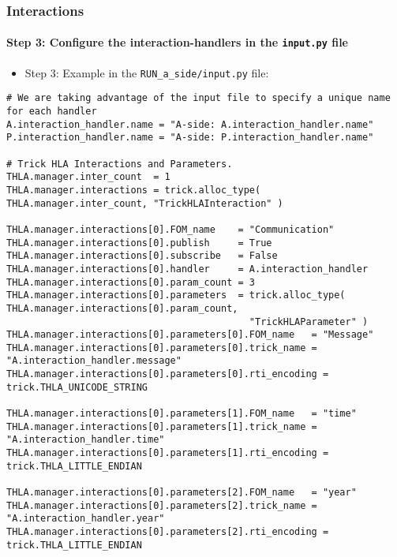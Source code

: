    \begin{frame}[fragile]
      \frametitle{Interactions}
      \framesubtitle{Step 3: Configure the interaction-handlers in the \texttt{input.py} file}
      \begin{itemize}
         \item Step 3: Example in the \texttt{RUN\_a\_side/input.py} file:
      \end{itemize}
\begin{Verbatim}[frame=single, fontsize=\tiny]
# We are taking advantage of the input file to specify a unique name for each handler
A.interaction_handler.name = "A-side: A.interaction_handler.name"
P.interaction_handler.name = "A-side: P.interaction_handler.name"

# Trick HLA Interactions and Parameters.
THLA.manager.inter_count  = 1
THLA.manager.interactions = trick.alloc_type( THLA.manager.inter_count, "TrickHLAInteraction" )

THLA.manager.interactions[0].FOM_name    = "Communication"
THLA.manager.interactions[0].publish     = True
THLA.manager.interactions[0].subscribe   = False
THLA.manager.interactions[0].handler     = A.interaction_handler
THLA.manager.interactions[0].param_count = 3
THLA.manager.interactions[0].parameters  = trick.alloc_type( THLA.manager.interactions[0].param_count,
                                           "TrickHLAParameter" )
THLA.manager.interactions[0].parameters[0].FOM_name   = "Message"
THLA.manager.interactions[0].parameters[0].trick_name = "A.interaction_handler.message"
THLA.manager.interactions[0].parameters[0].rti_encoding = trick.THLA_UNICODE_STRING

THLA.manager.interactions[0].parameters[1].FOM_name   = "time"
THLA.manager.interactions[0].parameters[1].trick_name = "A.interaction_handler.time"
THLA.manager.interactions[0].parameters[1].rti_encoding = trick.THLA_LITTLE_ENDIAN

THLA.manager.interactions[0].parameters[2].FOM_name   = "year"
THLA.manager.interactions[0].parameters[2].trick_name = "A.interaction_handler.year"
THLA.manager.interactions[0].parameters[2].rti_encoding = trick.THLA_LITTLE_ENDIAN
\end{Verbatim}
   \end{frame}

